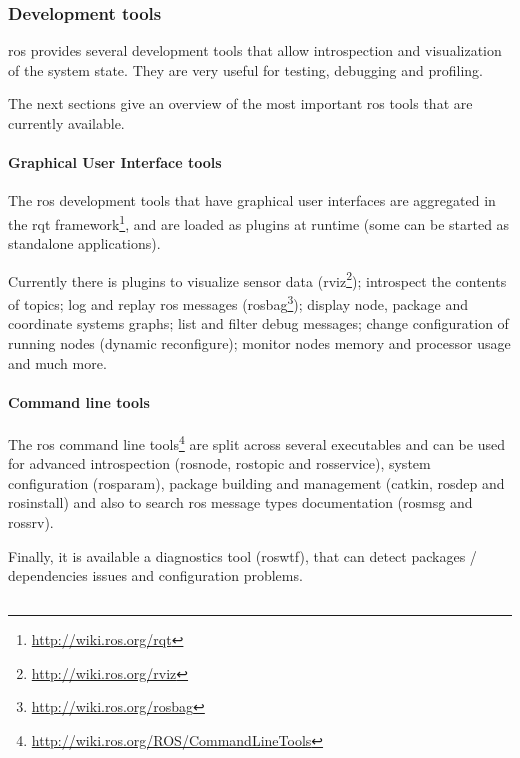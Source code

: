 \subsubsection{Development tools}

\gls{ros} provides several development tools that allow introspection and visualization of the system state. They are very useful for testing, debugging and profiling.

The next sections give an overview of the most important \gls{ros} tools that are currently available.


\paragraph{Graphical User Interface tools}

The \gls{ros} development tools that have graphical user interfaces are aggregated in the rqt framework\footnote{\url{http://wiki.ros.org/rqt}}, and are loaded as plugins at runtime (some can be started as standalone applications).

Currently there is plugins to visualize sensor data (rviz\footnote{\url{http://wiki.ros.org/rviz}}); introspect the contents of topics; log and replay \gls{ros} messages (rosbag\footnote{\url{http://wiki.ros.org/rosbag}}); display node, package and coordinate systems graphs; list and filter debug messages; change configuration of running nodes (dynamic reconfigure); monitor nodes memory and processor usage and much more.


\paragraph{Command line tools}

The \gls{ros} command line tools\footnote{\url{http://wiki.ros.org/ROS/CommandLineTools}} are split across several executables and can be used for advanced introspection (rosnode, rostopic and rosservice), system configuration (rosparam), package building and management (catkin, rosdep and rosinstall) and also to search \gls{ros} message types documentation (rosmsg and rossrv).

Finally, it is available a diagnostics tool (roswtf), that can detect packages / dependencies issues and configuration problems.



\subsection{}

